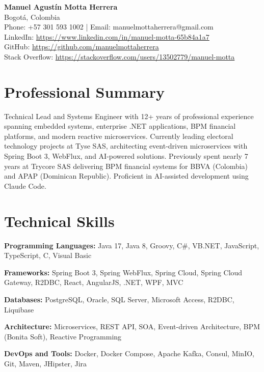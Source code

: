 \documentclass[11pt,a4paper]{article}
\begin{document}
\begin{center}
    {\LARGE\bfseries Manuel Agust\'{i}n Motta Herrera} \\[6pt]
    Bogot\'{a}, Colombia \\
    Phone: +57 301 593 1002 \quad | \quad Email: manuelmottaherrera@gmail.com \\
    LinkedIn: \url{https://www.linkedin.com/in/manuel-motta-65b84a1a7} \\
    GitHub: \url{https://github.com/manuelmottaherrera} \\
    Stack Overflow: \url{https://stackoverflow.com/users/13502779/manuel-motta}
\end{center}

\section{Professional Summary}

Technical Lead and Systems Engineer with 12+ years of professional experience spanning embedded systems, enterprise .NET applications, BPM financial platforms, and modern reactive microservices. Currently leading electoral technology projects at Tyse SAS, architecting event-driven microservices with Spring Boot 3, WebFlux, and AI-powered solutions. Previously spent nearly 7 years at Trycore SAS delivering BPM financial systems for BBVA (Colombia) and APAP (Dominican Republic). Proficient in AI-assisted development using Claude Code.

\section{Technical Skills}

\textbf{Programming Languages:} Java 17, Java 8, Groovy, C\#, VB.NET, JavaScript, TypeScript, C, Visual Basic

\textbf{Frameworks:} Spring Boot 3, Spring WebFlux, Spring Cloud, Spring Cloud Gateway, R2DBC, React, AngularJS, .NET, WPF, MVC

\textbf{Databases:} PostgreSQL, Oracle, SQL Server, Microsoft Access, R2DBC, Liquibase

\textbf{Architecture:} Microservices, REST API, SOA, Event-driven Architecture, BPM (Bonita Soft), Reactive Programming

\textbf{DevOps and Tools:} Docker, Docker Compose, Apache Kafka, Consul, MinIO, Git, Maven, JHipster, Jira
\end{document}
